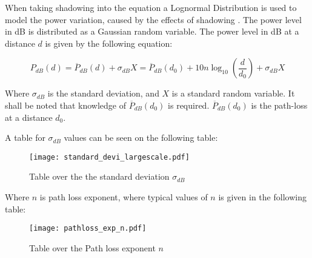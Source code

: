 When taking shadowing into the equation a Lognormal Distribution is used to model the power variation, caused by the effects of shadowing \citep{large_scale_fade3}. The power level in dB is distributed as a Gaussian random variable. The power level in dB at a distance $d$ is given by the following equation:

\begin{equation}
P_{dB}(d) = \overline{P}_{dB}(d)+ \sigma_{dB}X = \overline{P}_{dB}(d_{0}) + 10n\log_{10}(\frac{d}{d_{0}})+ \sigma_{dB}X
\label{power_level}
\end{equation}     

Where $\sigma_{dB}$ is the standard deviation, and $X$ is a standard random variable. It shall be noted that knowledge of $\overline{P}_{dB}(d_{0})$ is required. $\overline{P}_{dB}(d_{0})$ is the path-loss at a distance $d_{0}$. 

A table for $\sigma_{dB}$ values can be seen on the following table:

\begin{figure}[H]
\centering
\texttt{[image: standard\_devi\_largescale.pdf]}
\caption{Table over the the standard deviation $\sigma_{dB}$ \citep{large_scale_fade3} }
\label{large_scale_shadow_stan_dev_val}
\end{figure}

Where $n$ is path loss exponent, where typical values of $n$ is given in the following table:

\begin{figure}[H]
\centering
\texttt{[image: pathloss\_exp\_n.pdf]}
\caption{Table over the Path loss exponent $n$ \citep{large_scale_fade3} }
\label{large_scale_shadow_pathloss_expo_n}
\end{figure}


